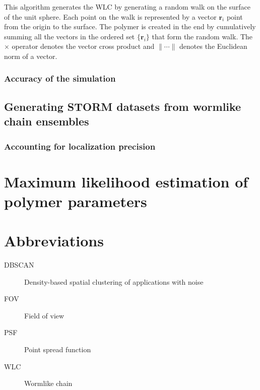 \documentclass[12pt, a4paper]{article}
\begin{document}
This algorithm generates the WLC by generating a random walk on the
surface of the unit sphere. Each point on the walk is represented
by a vector $\mathbf{r}_i$ point from the origin to the
surface. The polymer is created in the end by cumulatively summing
all the vectors in the ordered set $\{\mathbf{r}_i\}$ that form the
random walk. The $\times$ operator denotes the vector cross product
and $\lVert \cdots \rVert$ denotes the Euclidean norm of a vector.

\subsubsection{Accuracy of the simulation}
\label{sec-2-2-1}

\subsection{Generating STORM datasets from wormlike chain ensembles}
\label{sec-2-3}

\subsubsection{Accounting for localization precision}
\label{sec-2-3-1}
\label{sec-LocPrecision}

\section{Maximum likelihood estimation of polymer parameters}
\label{sec-3}
\label{sec-MLE}
\section{Abbreviations}
\label{sec-4}
\begin{description}
\item[{DBSCAN}] Density-based spatial clustering of applications with
noise
\item[{FOV}] Field of view
\item[{PSF}] Point spread function
\item[{WLC}] Wormlike chain
\end{description}

\printbibliography
\end{document}
